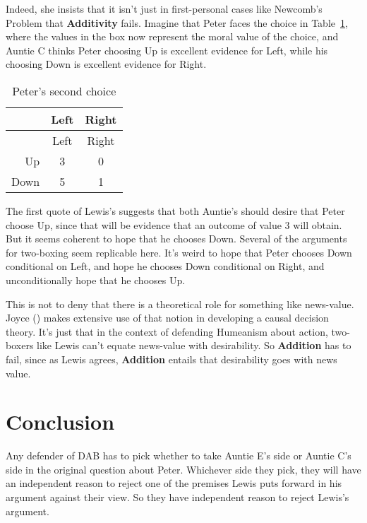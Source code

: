 \documentclass[
  11pt,
  letterpaper,
  DIV=11,
  numbers=noendperiod,
  twoside]{scrartcl}
\begin{document}
Indeed, she insists that it isn't just in first-personal cases like
Newcomb's Problem that \textbf{Additivity} fails. Imagine that Peter
faces the choice in Table~\ref{tbl-peter-second}, where the values in
the box now represent the moral value of the choice, and Auntie C thinks
Peter choosing Up is excellent evidence for Left, while his choosing
Down is excellent evidence for Right.

\begin{longtable}[]{@{}rcc@{}}
\caption{Peter's second choice}\label{tbl-peter-second}\tabularnewline
\toprule\noalign{}
& Left & Right \\
\midrule\noalign{}
\endfirsthead
\toprule\noalign{}
& Left & Right \\
\midrule\noalign{}
\endhead
\bottomrule\noalign{}
\endlastfoot
Up & 3 & 0 \\
Down & 5 & 1 \\
\end{longtable}

The first quote of Lewis's suggests that both Auntie's should desire
that Peter choose Up, since that will be evidence that an outcome of
value 3 will obtain. But it seems coherent to hope that he chooses Down.
Several of the arguments for two-boxing seem replicable here. It's weird
to hope that Peter chooses Down conditional on Left, and hope he chooses
Down conditional on Right, and unconditionally hope that he chooses Up.

This is not to deny that there is a theoretical role for something like
news-value. Joyce () makes extensive use
of that notion in developing a causal decision theory. It's just that in
the context of defending Humeanism about action, two-boxers like Lewis
can't equate news-value with desirability. So \textbf{Addition} has to
fail, since as Lewis agrees, \textbf{Addition} entails that desirability
goes with news value.

\section{Conclusion}\label{sec-conclusion}

Any defender of DAB has to pick whether to take Auntie E's side or
Auntie C's side in the original question about Peter. Whichever side
they pick, they will have an independent reason to reject one of the
premises Lewis puts forward in his argument against their view. So they
have independent reason to reject Lewis's argument.
\end{document}
